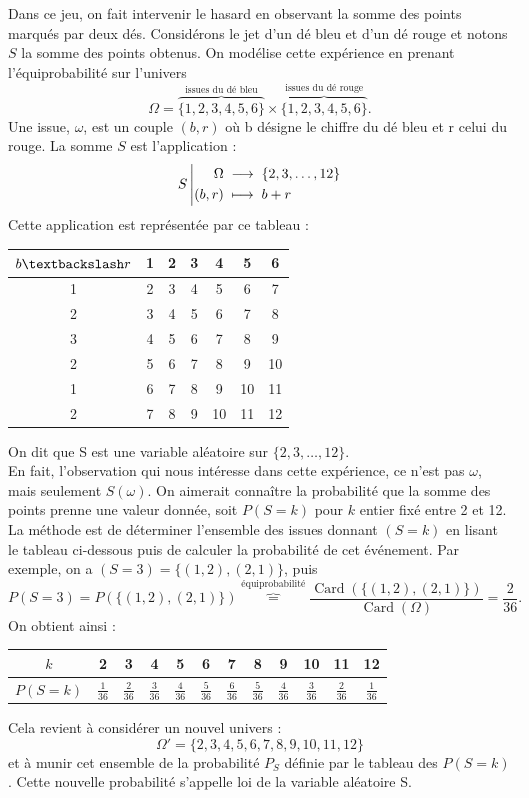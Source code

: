 \documentclass{book}
\begin{document}
\begin{Exemple}[Jeu]
Dans ce jeu, on fait intervenir le hasard en observant la somme des points marqués par deux dés. Considérons le jet d'un dé bleu et d'un dé
rouge et notons $S$ la somme des points obtenus. On modélise cette expérience
en prenant l'équiprobabilité sur l'univers  
$$\Omega=\overbrace{\{1,2,3,4,5,6\}}^{\text{issues du dé bleu}}\times \overbrace{\{1,2,3,4,5,6\}}^{\text{issues du dé rouge}}.$$
Une issue, $\omega$, est un couple $(b, r)$ où b désigne le chiffre du
dé bleu et r celui du rouge. La somme $S$ est l'application :
$${S}\left|\begin{aligned}{\Omega}&\;\longrightarrow\;{\{2,3,\dots,12\} }\\{(b, r)}&\;\longmapsto\;{b+r}\end{aligned}\right.$$ 
Cette application est représentée par ce tableau  : 
\begin{center}
\begin{tabular}{c||c|c|c|c|c|c}
 $b\textbackslash r$ & 1 & 2&3&4&5&6 \\\hline\hline
1 & 2 & 3 & 4&5&6&7\\
2 & 3 & 4 & 5&6&7&8\\
3 & 4 & 5 & 6&7&8&9\\
2 & 5 & 6 & 7&8&9&10\\
1 & 6 & 7 & 8&9&10&11\\
2 & 7 & 8 & 9&10&11&12\\
\end{tabular}
\end{center}
On dit que S est une variable aléatoire sur $\{2,3,\dots,12\}$.\\
En fait, l'observation qui nous intéresse dans cette expérience, ce n'est pas $\omega$,  mais seulement $S(\omega)$. On aimerait connaître la probabilité que
la somme des points prenne une valeur donnée, soit $P(S = k)$ pour $k$ entier
fixé entre 2 et 12. \\
La méthode est de déterminer l'ensemble des issues donnant $(S=k)$ en lisant le tableau ci-dessous puis de calculer la probabilité de cet événement. Par exemple, on a $(S=3)=\{(1,2),(2,1)\}$, puis $$P(S=3)=P(\{(1,2),(2,1)\})\overbrace{=}^{\text{équiprobabilité}}\frac{\operatorname{Card}(\{(1,2),(2,1)\}) }{\operatorname{Card}(\Omega)}=\frac{2}{36}.$$
On obtient ainsi :
\begin{center}
\begin{tabular}{|c||c|c|c|c|c|c|c|c|c|c|c|}
\hline
$k$ & 2 & 3& 4& 5& 6& 7& 8& 9& 10& 11& 12 \\\hline
$P(S=k)$ & $\frac{1}{36}$ & $\frac{2}{36}$& $\frac{3}{36}$& $\frac{4}{36}$& $\frac{5}{36}$& $\frac{6}{36}$& $\frac{5}{36}$& $\frac{4}{36}$& $\frac{3}{36}$& $\frac{2}{36}$& $\frac{1}{36}$\\\hline
\end{tabular}
\end{center}
Cela revient à considérer un nouvel univers :
$$\Omega'=\{2, 3, 4, 5, 6, 7, 8, 9, 10, 11, 12\}$$
et à munir cet ensemble de la probabilité $P_S$ définie par le tableau des $P(S =
k)$. Cette nouvelle probabilité s'appelle loi de la variable aléatoire S.
\end{Exemple}
\end{document}
